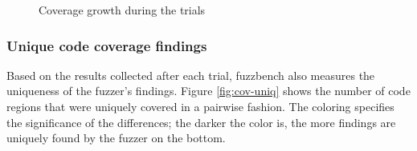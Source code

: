\begin{figure}
    \caption{Coverage growth during the trials}
    \label{fig:cov-growth}
\end{figure}

\subsubsection{Unique code coverage findings}

Based on the results collected after each trial, fuzzbench also measures the uniqueness of the fuzzer's findings. Figure \ref{fig:cov-uniq} shows the number of code regions that were uniquely covered in a pairwise fashion. The coloring specifies the significance of the differences; the darker the color is, the more findings are uniquely found by the fuzzer on the bottom.


